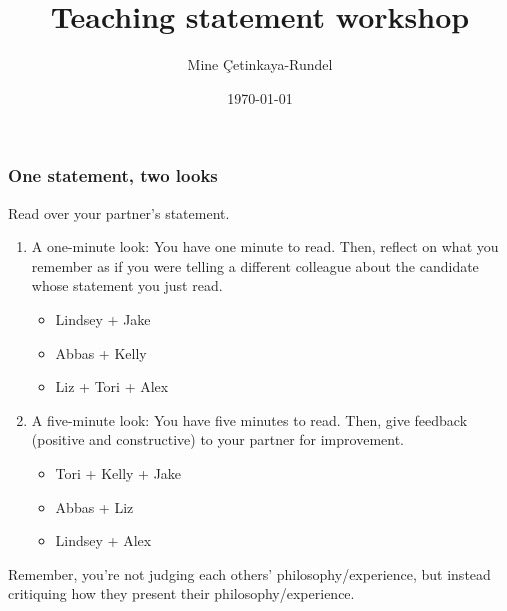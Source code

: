 \documentclass{beamer}
\title{Teaching statement workshop}
\date{\today}
\author{Mine \c{C}etinkaya-Rundel}
\institute{Sta 771S - Teaching Statistics}
\begin{document}
\maketitle
 

\begin{frame}[shrink]
\frametitle{One statement, two looks}

Read over your partner's statement. 

\begin{enumerate}

\item A one-minute look: You have one minute to read. Then, reflect on what you remember as if you were telling a different colleague about the candidate whose statement you just read.

\begin{itemize}
\item Lindsey + Jake
\item Abbas + Kelly
\item Liz + Tori + Alex
\end{itemize}

\item A five-minute look: You have five minutes to read. Then, give feedback (positive and constructive) to your partner for improvement.

\begin{itemize}
\item Tori + Kelly + Jake
\item Abbas + Liz
\item Lindsey + Alex
\end{itemize}

\end{enumerate}

Remember, you're not judging each others' philosophy/experience, but instead critiquing how they present their philosophy/experience.

\end{frame}

\end{document}
